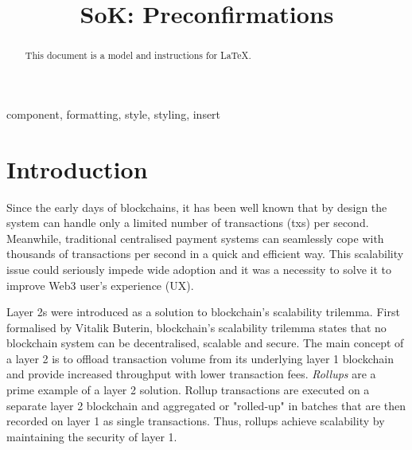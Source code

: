 \documentclass[conference]{IEEEtran}
\theoremstyle{boldstyle}
\begin{document}
\title{SoK: Preconfirmations}

\author{
\and
{}
\and
{}
}

\maketitle

\begin{abstract}
This document is a model and instructions for \LaTeX.
\end{abstract}

\begin{IEEEkeywords}
component, formatting, style, styling, insert
\end{IEEEkeywords}

\section{Introduction}

Since the early days of blockchains, it has been well known that by design the system can handle only a limited number of transactions (txs) per second. Meanwhile, traditional centralised payment systems can seamlessly cope with thousands of transactions per second in a quick and efficient way. This scalability issue could seriously impede wide adoption and it was a necessity to solve it to improve Web3 user's experience (UX).

Layer 2s were introduced as a solution to blockchain's scalability trilemma. First formalised by Vitalik Buterin, blockchain's scalability trilemma states that no blockchain system can be decentralised, scalable and secure. The main concept of a layer 2 is to offload transaction volume from its underlying layer 1 blockchain and provide increased throughput with lower transaction fees. \textit{Rollups} are a prime example of a layer 2 solution. Rollup transactions are executed on a separate layer 2 blockchain and aggregated or "rolled-up" in batches that are then recorded on layer 1 as single transactions. Thus, rollups achieve scalability by maintaining the security of layer 1.
\end{document}
